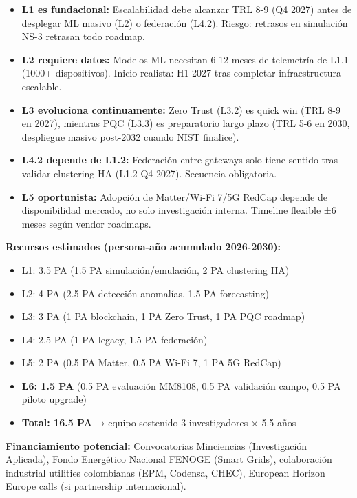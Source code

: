 \begin{itemize}
    \item \textbf{L1 es fundacional:} Escalabilidad debe alcanzar TRL 8-9 (Q4 2027) antes de desplegar ML masivo (L2) o federación (L4.2). Riesgo: retrasos en simulación NS-3 retrasan todo roadmap.
    
    \item \textbf{L2 requiere datos:} Modelos ML necesitan 6-12 meses de telemetría de L1.1 (1000+ dispositivos). Inicio realista: H1 2027 tras completar infraestructura escalable.
    
    \item \textbf{L3 evoluciona continuamente:} Zero Trust (L3.2) es quick win (TRL 8-9 en 2027), mientras PQC (L3.3) es preparatorio largo plazo (TRL 5-6 en 2030, despliegue masivo post-2032 cuando NIST finalice).
    
    \item \textbf{L4.2 depende de L1.2:} Federación entre gateways solo tiene sentido tras validar clustering HA (L1.2 Q4 2027). Secuencia obligatoria.
    
    \item \textbf{L5 oportunista:} Adopción de Matter/Wi-Fi 7/5G RedCap depende de disponibilidad mercado, no solo investigación interna. Timeline flexible ±6 meses según vendor roadmaps.
\end{itemize}

\textbf{Recursos estimados (persona-año acumulado 2026-2030):}
\begin{itemize}
    \item L1: 3.5 PA (1.5 PA simulación/emulación, 2 PA clustering HA)
    \item L2: 4 PA (2.5 PA detección anomalías, 1.5 PA forecasting)
    \item L3: 3 PA (1 PA blockchain, 1 PA Zero Trust, 1 PA PQC roadmap)
    \item L4: 2.5 PA (1 PA legacy, 1.5 PA federación)
    \item L5: 2 PA (0.5 PA Matter, 0.5 PA Wi-Fi 7, 1 PA 5G RedCap)
    \item \textbf{L6: 1.5 PA} (0.5 PA evaluación MM8108, 0.5 PA validación campo, 0.5 PA piloto upgrade)
    \item \textbf{Total: 16.5 PA} → equipo sostenido 3 investigadores $\times$ 5.5 años
\end{itemize}

\textbf{Financiamiento potencial:} Convocatorias Minciencias (Investigación Aplicada), Fondo Energético Nacional FENOGE (Smart Grids), colaboración industrial utilities colombianas (EPM, Codensa, CHEC), European Horizon Europe calls (si partnership internacional).

